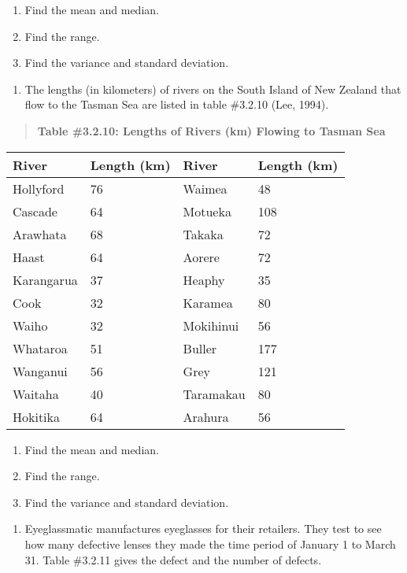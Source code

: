 \documentclass[]{book}
\providecommand{\tightlist}{%
  \setlength{\itemsep}{0pt}\setlength{\parskip}{0pt}}
\begin{document}
\begin{enumerate}
\def\labelenumi{\alph{enumi}.}
\item
  Find the mean and median.
\item
  Find the range.
\item
  Find the variance and standard deviation.
\end{enumerate}

\begin{enumerate}
\def\labelenumi{\arabic{enumi}.}
\setcounter{enumi}{2}
\tightlist
\item
  The lengths (in kilometers) of rivers on the South Island of New
  Zealand that flow to the Tasman Sea are listed in table \#3.2.10
  (Lee, 1994).
\end{enumerate}

\begin{quote}
\textbf{Table \#3.2.10: Lengths of Rivers (km) Flowing to Tasman Sea}
\end{quote}

\begin{longtable}[]{@{}llll@{}}
\toprule
River & Length (km) & River & Length (km)\tabularnewline
\midrule
\endhead
Hollyford & 76 & Waimea & 48\tabularnewline
Cascade & 64 & Motueka & 108\tabularnewline
Arawhata & 68 & Takaka & 72\tabularnewline
Haast & 64 & Aorere & 72\tabularnewline
Karangarua & 37 & Heaphy & 35\tabularnewline
Cook & 32 & Karamea & 80\tabularnewline
Waiho & 32 & Mokihinui & 56\tabularnewline
Whataroa & 51 & Buller & 177\tabularnewline
Wanganui & 56 & Grey & 121\tabularnewline
Waitaha & 40 & Taramakau & 80\tabularnewline
Hokitika & 64 & Arahura & 56\tabularnewline
\bottomrule
\end{longtable}

\begin{enumerate}
\def\labelenumi{\alph{enumi}.}
\item
  Find the mean and median.
\item
  Find the range.
\item
  Find the variance and standard deviation.
\end{enumerate}

\begin{enumerate}
\def\labelenumi{\arabic{enumi}.}
\setcounter{enumi}{3}
\tightlist
\item
  Eyeglassmatic manufactures eyeglasses for their retailers. They test
  to see how many defective lenses they made the time period of
  January 1 to March 31. Table \#3.2.11 gives the defect and the
  number of defects.
\end{enumerate}
\end{document}
